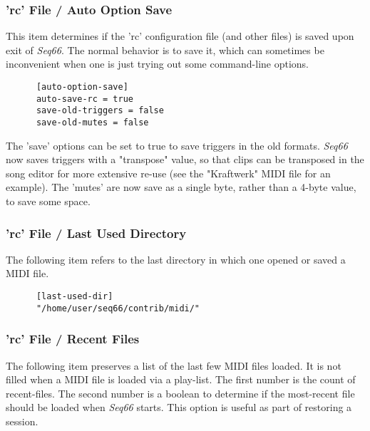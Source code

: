 \subsubsection{'rc' File / Auto Option Save}
\label{subsubsec:configuration_rc_auto_option_save}

   This item determines if the 'rc' configuration file (and other files)
   is saved upon exit of \textsl{Seq66}.
   The normal behavior is to save it,
   which can sometimes be inconvenient when one is just trying out some
   command-line options.

   \begin{verbatim}
      [auto-option-save]
      auto-save-rc = true
      save-old-triggers = false
      save-old-mutes = false
   \end{verbatim}

   The 'save' options can be set to true to save triggers in the old formats.
   \textsl{Seq66} now saves triggers with a "transpose" value, so that
   clips can be transposed in the song editor for more extensive re-use
   (see the "Kraftwerk" MIDI file for an example).
   The 'mutes' are now save as a single byte, rather than a 4-byte value, to
   save some space.

\subsubsection{'rc' File / Last Used Directory}
\label{subsubsec:configuration_rc_last_used_dir}

   The following item refers to the last directory in which one opened or
   saved a MIDI file.

   \begin{verbatim}
      [last-used-dir]
      "/home/user/seq66/contrib/midi/"
   \end{verbatim}

\subsubsection{'rc' File / Recent Files}
\label{subsubsec:configuration_rc_recent_files}

   The following item preserves a list of the last few MIDI files loaded.
   It is not filled when a MIDI file is loaded via a play-list.
   The first number is the count of recent-files.
   The second number is a boolean to determine if the most-recent file
   should be loaded when \textsl{Seq66} starts.
   This option is useful as part of restoring a session.

